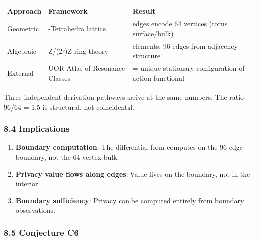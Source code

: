 \documentclass[
]{article}
\newcounter{none} %
\providecommand{\tightlist}{%
  \setlength{\itemsep}{0pt}\setlength{\parskip}{0pt}}
\begin{document}
{\def\LTcaptype{none} %
\begin{longtable}[]{@{}
  >{\raggedright\arraybackslash}p{}
  >{\raggedright\arraybackslash}p{}
  >{\raggedright\arraybackslash}p{}@{}}
\toprule\noalign{}
\begin{minipage}[b]{\linewidth}\raggedright
Approach
\end{minipage} & \begin{minipage}[b]{\linewidth}\raggedright
Framework
\end{minipage} & \begin{minipage}[b]{\linewidth}\raggedright
Result
\end{minipage} \\
\midrule\noalign{}
\endhead
\bottomrule\noalign{}
\endlastfoot
Geometric & 64-Tetrahedra lattice & 96 edges encode 64 vertices (torus
surface/bulk) \\
Algebraic & Z/(2⁶)Z ring theory & 64 elements; 96 edges from adjacency
structure \\
External & UOR Atlas of Resonance Classes & 96 = unique stationary
configuration of action functional \\
\end{longtable}
}

Three independent derivation pathways arrive at the same numbers. The
ratio 96/64 = 1.5 is structural, not coincidental.

\subsubsection{8.4 Implications}\label{implications}

\begin{enumerate}
\def\labelenumi{\arabic{enumi}.}
\tightlist
\item
  \textbf{Boundary computation}: The differential form computes on the
  96-edge boundary, not the 64-vertex bulk.
\item
  \textbf{Privacy value flows along edges}: Value lives on the boundary,
  not in the interior.
\item
  \textbf{Boundary sufficiency}: Privacy can be computed entirely from
  boundary observations.
\end{enumerate}

\subsubsection{8.5 Conjecture C6}\label{conjecture-c6}
\end{document}
